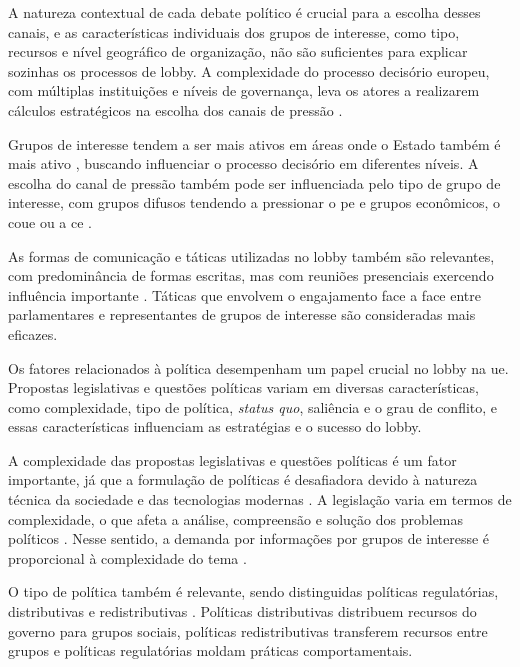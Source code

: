     A natureza contextual de cada debate político é crucial para a escolha desses canais, e as características individuais dos grupos de interesse, como tipo, recursos e nível geográfico de organização, não são suficientes para explicar sozinhas os processos de lobby. A complexidade do processo decisório europeu, com múltiplas instituições e níveis de governança, leva os atores a realizarem cálculos estratégicos na escolha dos canais de pressão \cite{kluver2015legislative}.

    Grupos de interesse tendem a ser mais ativos em áreas onde o Estado também é mais ativo \cite{mahoney2008brussels}, buscando influenciar o processo decisório em diferentes níveis. A escolha do canal de pressão também pode ser influenciada pelo tipo de grupo de interesse, com grupos difusos tendendo a pressionar o \acrshort{pe} e grupos econômicos, o \acrshort{coue} ou a \acrshort{ce} \cite{coen2019legislative}.

    As formas de comunicação e táticas utilizadas no lobby também são relevantes, com predominância de formas escritas, mas com reuniões presenciais exercendo influência importante \cite{Huwyler2022}. Táticas que envolvem o engajamento face a face entre parlamentares e representantes de grupos de interesse são consideradas mais eficazes.

Os fatores relacionados à política desempenham um papel crucial no lobby na \acrshort{ue}. Propostas legislativas e questões políticas variam em diversas características, como complexidade, tipo de política, \textit{status quo}, saliência e o grau de conflito, e essas características influenciam as estratégias e o sucesso do lobby.

    A complexidade das propostas legislativas e questões políticas é um fator importante, já que a formulação de políticas é desafiadora devido à natureza técnica da sociedade e das tecnologias modernas \cite{kluver2015legislative}. A legislação varia em termos de complexidade, o que afeta a análise, compreensão e solução dos problemas políticos \cite{kluver_informational_2012}. Nesse sentido, a demanda por informações por grupos de interesse é proporcional à complexidade do tema \cite{kluver_informational_2012}.

    O tipo de política também é relevante, sendo distinguidas políticas regulatórias, distributivas e redistributivas \cite{lowi1964american}. Políticas distributivas distribuem recursos do governo para grupos sociais, políticas redistributivas transferem recursos entre grupos e políticas regulatórias moldam práticas comportamentais.


